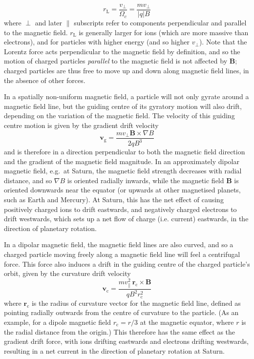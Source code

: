 \begin{equation}
r_\mathrm{L} = \frac{v_\perp}{\Omega_c} = \frac{mv_\perp}{|q|B}
\end{equation}
where $\perp$ and later $\parallel$ subscripts refer to components perpendicular and parallel to the magnetic field. $r_\mathrm{L}$ is generally larger for ions (which are more massive than electrons), and for particles with higher energy (and so higher $v_\perp$). Note that the Lorentz force acts perpendicular to the magnetic field by definition, and so the motion of charged particles \textit{parallel} to the magnetic field is not affected by $\boldsymbol{B}$; charged particles are thus free to move up and down along magnetic field lines, in the absence of other forces.

In a spatially non-uniform magnetic field, a particle will not only gyrate around a magnetic field line, but the guiding centre of its gyratory motion will also drift, depending on the variation of the magnetic field. The velocity of this guiding centre motion is given by the gradient drift velocity
\begin{equation}
\boldsymbol{v}_\mathrm{g} = \frac{mv_\perp\boldsymbol{B}\times\nabla B}{2qB^3}
\end{equation}
and is therefore in a direction perpendicular to both the magnetic field direction and the gradient of the magnetic field magnitude. In an approximately dipolar magnetic field, e.g.\ at Saturn, the magnetic field strength decreases with radial distance, and so $\nabla B$ is oriented radially inwards, while the magnetic field $\boldsymbol{B}$ is oriented downwards near the equator (or upwards at other magnetised planets, such as Earth and Mercury). At Saturn, this has the net effect of causing positively charged ions to drift eastwards, and negatively charged electrons to drift westwards, which sets up a net flow of charge (i.e. current) eastwards, in the direction of planetary rotation.

In a dipolar magnetic field, the magnetic field lines are also curved, and so a charged particle moving freely along a magnetic field line will feel a centrifugal force. This force also induces a drift in the guiding centre of the charged particle's orbit, given by the curvature drift velocity
\begin{equation}
\boldsymbol{v}_\mathrm{c} = \frac{mv_\parallel^2~\boldsymbol{r}_\mathrm{c}\times\boldsymbol{B}}{qB^2r_\mathrm{c}^2}
\end{equation}
where $\boldsymbol{r}_\mathrm{c}$ is the radius of curvature vector for the magnetic field line, defined as pointing radially outwards from the centre of curvature to the particle. (As an example, for a dipole magnetic field $r_\mathrm{c}= r/3$ at the magnetic equator, where $r$ is the radial distance from the origin.) This therefore has the same effect as the gradient drift force, with ions drifting eastwards and electrons drifting westwards, resulting in a net current in the direction of planetary rotation at Saturn. 

